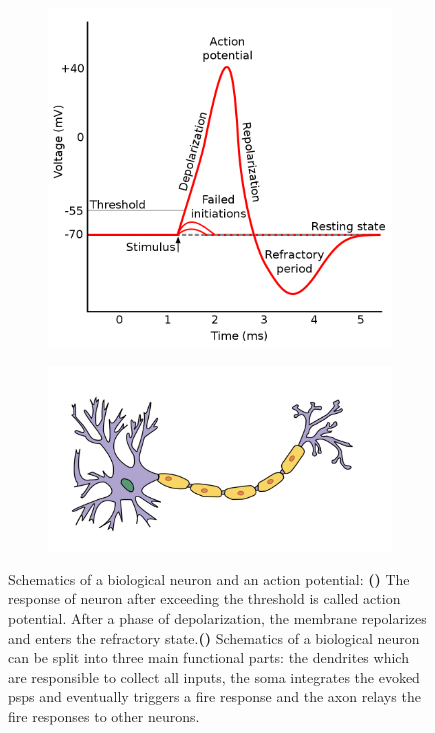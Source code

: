 \begin{figure}
	\begin{subfigure}{0.5\textwidth}
		\centering
		\caption{}
		\includegraphics[width=0.8\linewidth, valign=t]{figures/action_potential.png}
		\label{actionpotential}
	\end{subfigure}
	\begin{subfigure}{0.5\textwidth}
		\centering
		\caption{}
		\vspace{0.5cm}
		\includegraphics[width=\linewidth, valign=t]{figures/neuron_model.png}
		\vspace{1.5cm}	
		\label{biosynapse}
	\end{subfigure}
	\caption[Schematics of an action potential and a biological neuron]{Schematics of a biological neuron and an action potential: \textbf{()} The response of neuron after exceeding the threshold is called action potential. After a phase of depolarization, the membrane repolarizes and enters the refractory state.\textbf{()} Schematics of a biological neuron can be split into three main functional parts: the dendrites which are responsible to collect all inputs, the soma integrates the evoked \glspl{psp} and eventually triggers a fire response and the axon relays the fire responses to other neurons.}
	\label{biologicalneuron}

\end{figure}

